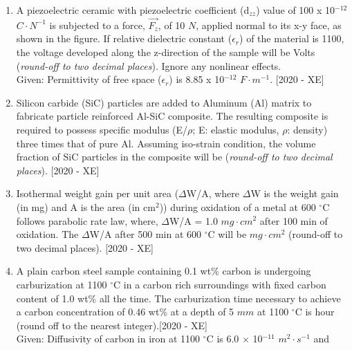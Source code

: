 \documentclass[journal]{IEEEtran}
\begin{document}
\begin{enumerate}
    \item A piezoelectric ceramic with piezoelectric coefficient (d$_{zz}$) value of 100 x 10$^{-12}$ $C\cdot N^{-1}$ is subjected to a force, $\vec{F_z}$, of 10 $N$, applied normal to its x-y face, as shown in the figure. If relative dielectric constant ($\epsilon_r$) of the material is 1100, the voltage developed along the z-direction of the sample will be Volts \underline{\hspace{3cm}}(\textit{round-off to two decimal places}). Ignore any nonlinear effects.\\
    Given: Permittivity of free space ($\epsilon_r$) is 8.85 x 10$^{-12}$ $F\cdot m^{-1}$. \hfill{[2020 - XE]}
    

    \item Silicon carbide (SiC) particles are added to Aluminum (Al) matrix to fabricate particle reinforced Al-SiC composite. The resulting composite is required to possess specific modulus (E/$\rho$; E: elastic modulus, $\rho$: density) three times that of pure Al. Assuming iso-strain condition, the volume fraction of SiC particles in the composite will be (\textit{round-off to two decimal places}). \hfill{[2020 - XE]}
    \begin{table}[h]
        \centering
        
    \end{table}
    \item Isothermal weight gain per unit area ($\Delta$W/A, where $\Delta$W is the weight gain (in mg) and A is the area (in cm$^2$)) during oxidation of a metal at 600 $^\circ$C follows parabolic rate law, where, $\Delta$W/A = 1.0 $mg\cdot cm^2$ after 100 min of oxidation. The $\Delta$W/A after 500 min at 600 $^\circ$C will be $mg\cdot cm^2$ (round-off to two decimal places). \hfill{[2020 - XE]}
    \item A plain carbon steel sample containing 0.1 wt\% carbon is undergoing carburization at 1100 $^\circ$C in a carbon rich surroundings with fixed carbon content of 1.0 wt\% all the time. The carburization time necessary to achieve a carbon concentration of 0.46 wt\% at a depth of 5 $mm$ at 1100 $^\circ$C is \underline{\hspace{3cm}}hour (round off to the nearest integer).\hfill{[2020 - XE]} \\
    Given: Diffusivity of carbon in iron at 1100 $^\circ$C is 6.0 $\times$ 10$^{-11}$ $m^2\cdot s^{-1}$ and 
    \begin{table}[h]
        \centering
        
    \end{table}
\end{enumerate}
\end{document}
